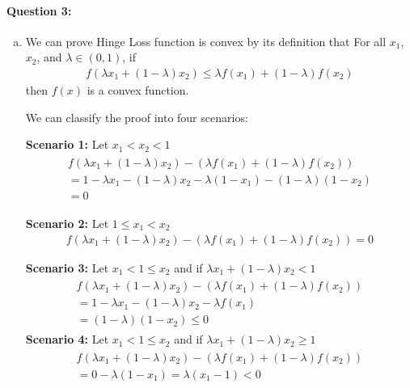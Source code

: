 \documentclass[letterpaper,11pt]{article}
\begin{document}
\paragraph{Question 3:}
\begin{enumerate}[(a)]
\item \begin{enumerate}
We can prove Hinge Loss function is convex by its definition that 
For all $x_1$, $x_2$, and $\lambda  \in (0,1)$, if
\begin{eqnarray}
f(\lambda {x_1} + (1 - \lambda ){x_2}) \le \lambda f({x_1}) + (1 - \lambda )f({x_2})
\end{eqnarray}
then $f(x)$ is a convex function.

We can classify the proof into four scenarios:

{\bf Scenario 1:}
Let ${x_1} < {x_2} < 1$
\begin{eqnarray}
\begin{array}{l}
f(\lambda {x_1} + (1 - \lambda ){x_2}) - (\lambda f({x_1}) + (1 - \lambda )f({x_2}))\\
 = 1 - \lambda {x_1} - (1 - \lambda ){x_2} - \lambda (1 - {x_1}) - (1 - \lambda )(1 - {x_2})\\
 = 0
\end{array}
\end{eqnarray}


{\bf Scenario 2:}
Let $1 \le {x_1} < {x_2}$
\begin{eqnarray}
f(\lambda {x_1} + (1 - \lambda ){x_2}) - (\lambda f({x_1}) + (1 - \lambda )f({x_2})) = 0
\end{eqnarray}


{\bf Scenario 3:}
Let ${x_1} < 1 \le {x_2}$ and if $\lambda {x_1} + (1 - \lambda ){x_2} < 1$
\begin{eqnarray}
\begin{array}{l}
f(\lambda {x_1} + (1 - \lambda ){x_2}) - (\lambda f({x_1}) + (1 - \lambda )f({x_2}))\\
 = 1 - \lambda {x_1} - (1 - \lambda ){x_2} - \lambda f({x_1})\\
 = (1 - \lambda )(1 - {x_2}) \le 0
\end{array}
\end{eqnarray}
{\bf Scenario 4:}
Let ${x_1} < 1 \le {x_2}$ and if $\lambda {x_1} + (1 - \lambda ){x_2} \ge 1$
\begin{eqnarray}
\begin{array}{l}
f(\lambda {x_1} + (1 - \lambda ){x_2}) - (\lambda f({x_1}) + (1 - \lambda )f({x_2}))\\
 = 0 - \lambda (1 - {x_1}) = \lambda ({x_1} - 1) < 0
\end{array}
\end{eqnarray}


\end{enumerate}
\end{enumerate}
\end{document}
